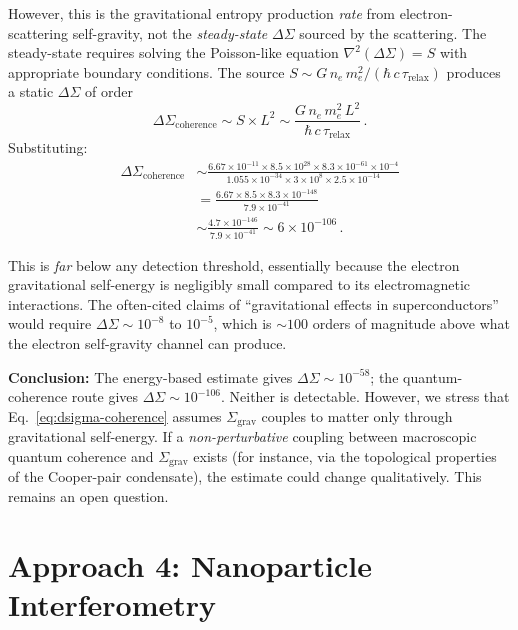 \documentclass[prd,twocolumn,superscriptaddress,longbibliography,floatfix]{revtex4-2}
\newcommand{\Sgrav}{\Sigma_{\mathrm{grav}}}
\newcommand{\DSigma}{\Delta\Sigma}
\newcommand{\trel}{\tau_{\mathrm{relax}}}
\begin{document}
However, this is the gravitational entropy production
\emph{rate} from electron-scattering self-gravity, not the
\emph{steady-state} $\DSigma$ sourced by the scattering.  The
steady-state requires solving the Poisson-like equation
$\nabla^2(\DSigma) = S$ with appropriate boundary conditions.
The source $S \sim G\,n_e\,m_e^2/(\hbar\,c\,\trel)$
produces a static $\DSigma$ of order
\begin{equation}
  \DSigma_{\mathrm{coherence}} \sim S \times L^2
  \sim \frac{G\,n_e\,m_e^2\,L^2}{\hbar\,c\,\trel}\,.
  \label{eq:dsigma-coherence}
\end{equation}
Substituting:
\begin{align}
  \DSigma_{\mathrm{coherence}} &\sim
  \frac{6.67 \times 10^{-11} \times 8.5 \times 10^{28}
  \times 8.3 \times 10^{-61} \times 10^{-4}}
  {1.055 \times 10^{-34} \times 3 \times 10^8
  \times 2.5 \times 10^{-14}}
  \nonumber \\
  &= \frac{6.67 \times 8.5 \times 8.3 \times 10^{-148}}
  {7.9 \times 10^{-41}}
  \nonumber \\
  &\sim \frac{4.7 \times 10^{-146}}{7.9 \times 10^{-41}}
  \sim 6 \times 10^{-106}\,.
  \label{eq:dsigma-coherence-num}
\end{align}

This is \emph{far} below any detection threshold, essentially because
the electron gravitational self-energy is negligibly small compared
to its electromagnetic interactions.  The often-cited claims of
``gravitational effects in superconductors''
\cite{Podkletnov1992,Tajmar2006} would require $\DSigma \sim 10^{-8}$
to $10^{-5}$, which is $\sim 100$ orders of magnitude above what the
electron self-gravity channel can produce.

\textbf{Conclusion:} The energy-based estimate gives $\DSigma \sim
10^{-58}$; the quantum-coherence route gives $\DSigma \sim 10^{-106}$.
Neither is detectable.  However, we stress that
Eq.~\eqref{eq:dsigma-coherence} assumes $\Sgrav$ couples to matter
only through gravitational self-energy.  If a \emph{non-perturbative}
coupling between macroscopic quantum coherence and $\Sgrav$ exists
(for instance, via the topological properties of the Cooper-pair
condensate), the estimate could change qualitatively.  This remains
an open question.

\section{Approach 4: Nanoparticle Interferometry}
\label{sec:nanoparticle}
\end{document}
